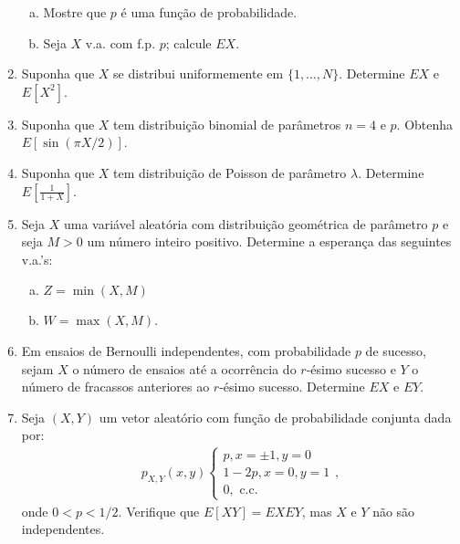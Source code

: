 \documentclass[../Notas.tex]{subfiles}
\begin{document}
\begin{enumerate}
\begin{enumerate}[a)]
        \item Mostre que $p$ é uma função de probabilidade.
        \item Seja $X$ v.a. com f.p. $p$; calcule $EX$.
    \end{enumerate}
    \item Suponha que $X$ se distribui uniformemente em $\{1, \dots , N\}$. Determine $EX$ e $E[X^2]$.
    \item Suponha que $X$ tem distribuição binomial de parâmetros $n = 4$ e $p$. Obtenha $E[\sin(\pi X/2)]$.
    \item Suponha que $X$ tem distribuição de Poisson de parâmetro $\lambda$. Determine $\displaystyle{E[\frac{1}{1+X}]}$.
    \item Seja $X$ uma variável aleatória com distribuição geométrica de parâmetro $p$ e seja $M > 0$ um número inteiro positivo. Determine a esperança das seguintes v.a.’s:
    \begin{enumerate}[a)]
    \item $Z = \min(X, M)$
    \item $W = \max(X, M)$.
    \end{enumerate}
    \item Em ensaios de Bernoulli independentes, com probabilidade $p$ de sucesso, sejam $X$ o número de ensaios até a ocorrência do $r$-ésimo sucesso e $Y$ o número de fracassos anteriores ao $r$-ésimo sucesso. Determine $EX$ e $EY$.
    \item Seja $(X,Y)$ um vetor aleatório com função de probabilidade conjunta dada por:
    \begin{align*}
        p_{X,Y}(x,y)\begin{cases}
            p, x = \pm 1, y = 0 \\
            1-2p, x = 0, y = 1 \\
            0, \text{ c.c.}
        \end{cases},
    \end{align*}
onde $0 < p < 1/2$. Verifique que $E[XY] = EXEY$, mas $X$ e $Y$ não são independentes.
\end{enumerate}
\end{document}
